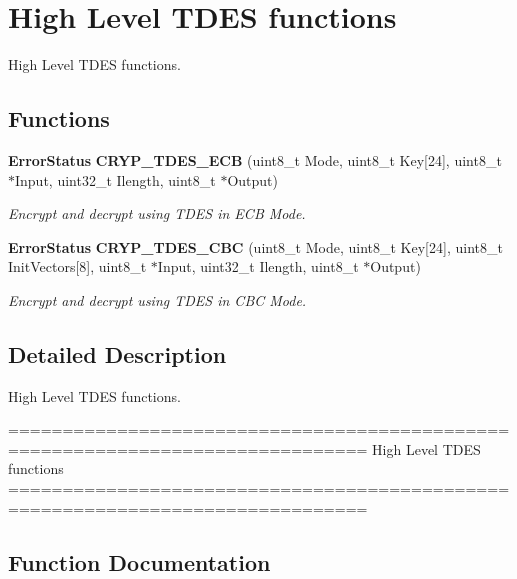 \section{High Level T\+D\+ES functions}
\label{group__CRYP__Group7}


High Level T\+D\+ES functions.  


\subsection*{Functions}
\begin{DoxyCompactItemize}
\item 
\textbf{ Error\+Status} \textbf{ C\+R\+Y\+P\+\_\+\+T\+D\+E\+S\+\_\+\+E\+CB} (uint8\+\_\+t Mode, uint8\+\_\+t Key[24], uint8\+\_\+t $\ast$Input, uint32\+\_\+t Ilength, uint8\+\_\+t $\ast$Output)
\begin{DoxyCompactList}\small\item\em Encrypt and decrypt using T\+D\+ES in E\+CB Mode. \end{DoxyCompactList}\item 
\textbf{ Error\+Status} \textbf{ C\+R\+Y\+P\+\_\+\+T\+D\+E\+S\+\_\+\+C\+BC} (uint8\+\_\+t Mode, uint8\+\_\+t Key[24], uint8\+\_\+t Init\+Vectors[8], uint8\+\_\+t $\ast$Input, uint32\+\_\+t Ilength, uint8\+\_\+t $\ast$Output)
\begin{DoxyCompactList}\small\item\em Encrypt and decrypt using T\+D\+ES in C\+BC Mode. \end{DoxyCompactList}\end{DoxyCompactItemize}


\subsection{Detailed Description}
High Level T\+D\+ES functions. 

\begin{DoxyVerb} ===============================================================================
                          High Level TDES functions
 ===============================================================================\end{DoxyVerb}
 

\subsection{Function Documentation}
\mbox{\label{group__CRYP__Group7_gabe52a368c4882450c1e82f16bc1eb686}} 
